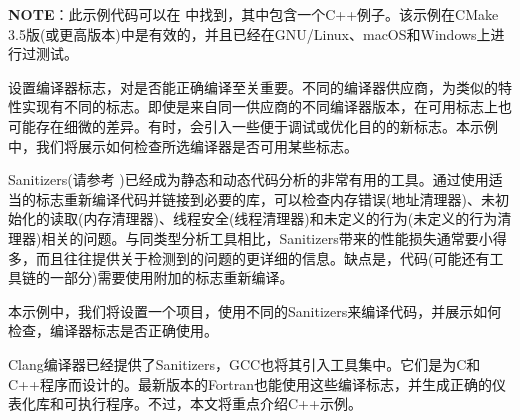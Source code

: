 \begin{myInfoBox}
\textbf{NOTE}：此示例代码可以在  中找到，其中包含一个C++例子。该示例在CMake 3.5版(或更高版本)中是有效的，并且已经在GNU/Linux、macOS和Windows上进行过测试。
\end{myInfoBox}

设置编译器标志，对是否能正确编译至关重要。不同的编译器供应商，为类似的特性实现有不同的标志。即使是来自同一供应商的不同编译器版本，在可用标志上也可能存在细微的差异。有时，会引入一些便于调试或优化目的的新标志。本示例中，我们将展示如何检查所选编译器是否可用某些标志。


Sanitizers(请参考 )已经成为静态和动态代码分析的非常有用的工具。通过使用适当的标志重新编译代码并链接到必要的库，可以检查内存错误(地址清理器)、未初始化的读取(内存清理器)、线程安全(线程清理器)和未定义的行为(未定义的行为清理器)相关的问题。与同类型分析工具相比，Sanitizers带来的性能损失通常要小得多，而且往往提供关于检测到的问题的更详细的信息。缺点是，代码(可能还有工具链的一部分)需要使用附加的标志重新编译。

本示例中，我们将设置一个项目，使用不同的Sanitizers来编译代码，并展示如何检查，编译器标志是否正确使用。


Clang编译器已经提供了Sanitizers，GCC也将其引入工具集中。它们是为C和C++程序而设计的。最新版本的Fortran也能使用这些编译标志，并生成正确的仪表化库和可执行程序。不过，本文将重点介绍C++示例。

